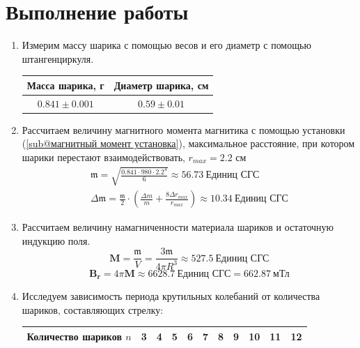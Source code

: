 \documentclass[a4paper, 12pt]{article}
\begin{document}
\section*{Выполнение работы}
\begin{enumerate}
    \item Измерим массу шарика с помощью весов и его диаметр с помощью штангенциркуля.
    \begin{table}[htbp]
        \centering
        \begin{tabular}{|c|c|}
            \hline
            Масса шарика, г & Диаметр шарика, см\\ \hline
            $0.841\pm 0.001$ & $0.59\pm 0.01$\\ \hline
        \end{tabular}
    \end{table}
    \item Рассчитаем величину магнитного момента магнитика с помощью установки (\ref{sub@магнитный момент установка}), максимальное
    расстояние, при котором шарики перестают взаимодействовать, $r_{max} = 2.2$ см
    \begin{equation*}
        \begin{aligned}
            \mathfrak{m} = \sqrt{\frac{0.841\cdot 980\cdot 2.2^{4}}{6}} \approx 56.73\ \text{Единиц СГС}\\
            \Delta \mathfrak{m} = \frac{\mathfrak{m}}{2}\cdot \left(\frac{\Delta m}{m} + \frac{8\Delta r_{max}}{r_{max}}\right) \approx 10.34\ \text{Единиц СГС}
        \end{aligned}
    \end{equation*}
    \item Рассчитаем величину намагниченности материала шариков и остаточную индукцию поля.
    \begin{equation*}
        \mathbf{M} = \frac{\mathfrak{m}}{V} = \frac{3\mathfrak{m}}{4\pi R^{3}} \approx 527.5\ \text{Единиц СГС}
    \end{equation*}
    \begin{equation*}
        \mathbf{B_{r}} = 4\pi \mathbf{M} \approx 6628.7\ \text{Единиц СГС} = 662.87\ \text{мТл}
    \end{equation*}
    \item Исследуем зависимость периода крутильных колебаний от количества шариков, составляющих стрелку:
    \begin{table}[htbp]
        \centering
        \begin{tabular}{|c|c|c|c|c|c|c|c|c|c|c|}
            \hline
            Количество шариков $n$ & 3 & 4 & 5 & 6 & 7 & 8 & 9 & 10 & 11 & 12\\ \hline

\end{tabular}
\end{table}
\end{enumerate}
\end{document}
